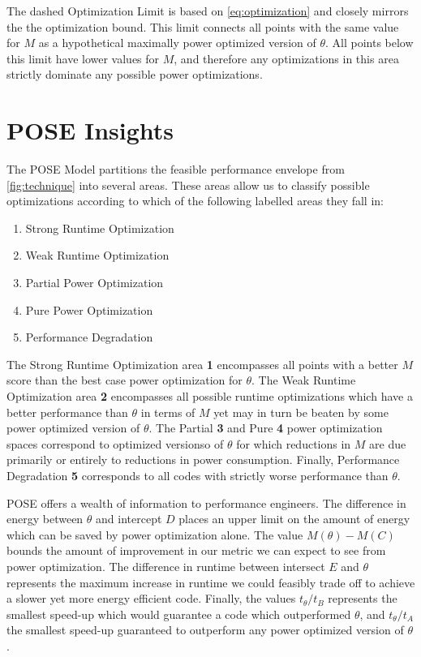 The dashed Optimization Limit is based on \autoref{eq:optimization} and closely mirrors the the optimization bound.
This limit connects all points with the same value for $M$ as a hypothetical maximally power optimized version of $\theta$. 
All points below this limit have lower values for $M$, and therefore any optimizations in this area strictly dominate any possible power optimizations. 


\section{POSE Insights}
\label{sec:insights}
The POSE Model partitions the feasible performance envelope from \autoref{fig:technique} into several areas.
These areas allow us to classify possible optimizations according to which of the following labelled areas they fall in:

\begin{enumerate}
\item Strong Runtime Optimization
\item Weak Runtime Optimization
\item Partial Power Optimization
\item Pure Power Optimization
\item Performance Degradation
\end{enumerate}

The Strong Runtime Optimization area \textbf{1} encompasses all points with a better $M$ score than the best case power optimization for $\theta$. The Weak Runtime Optimization area \textbf{2} encompasses all possible runtime optimizations which have a better performance than $\theta$ in terms of $M$ yet may in turn be beaten by some power optimized version of $\theta$. The Partial \textbf{3} and Pure \textbf{4} power optimization spaces correspond to optimized versionso of $\theta$ for which reductions in $M$ are due primarily or entirely to reductions in power consumption.
Finally, Performance Degradation \textbf{5} corresponds to all codes with strictly worse performance than $\theta$.


POSE offers a wealth of information to performance engineers.
The difference in energy between $\theta$ and intercept $D$ places an upper limit on the amount of energy which can be saved by power optimization alone.
The value $M(\theta) - M(C)$ bounds the amount of improvement in our metric we can expect to see from power optimization.
The difference in runtime between intersect $E$ and $\theta$ represents the maximum increase in runtime we could feasibly trade off to achieve a slower yet more energy efficient code.
Finally, the values $t_\theta / t_B$ represents the smallest speed-up which would guarantee a code which outperformed $\theta$, and $t_\theta / t_A$ the smallest speed-up guaranteed to outperform any power optimized version of $\theta$.

